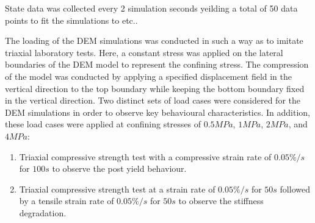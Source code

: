 State data was collected every 2 simulation seconds yeilding a total of 50 data points to fit the simulations to etc.. 

The loading of the DEM simulations was conducted in such a way as to imitate triaxial laboratory tests. Here, a constant stress was applied on the lateral boundaries of the DEM model to represent the confining stress. The compression of the model was conducted by applying a specified displacement field in the vertical direction to the top boundary while keeping the bottom boundary fixed in the vertical direction. Two distinct sets of load cases were considered for the DEM simulations in order to observe key behavioural characteristics. In addition, these load cases were applied at confining stresses of $0.5MPa$, $1MPa$, $2MPa$, and $4MPa$:

\begin{enumerate}
\item Triaxial compressive strength test with a compressive strain rate of $0.05\%/s$ for $100s$ to observe the post yield behaviour.
\item Triaxial compressive strength test at a strain rate of $0.05\%/s$ for $50s$ followed by a tensile strain rate of $0.05\%/s$ for $50s$ to observe the stiffness degradation.
\end{enumerate}




